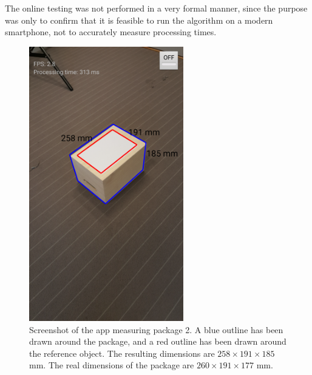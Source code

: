 The online testing was not performed in a very formal manner, since the purpose was only to confirm that it is feasible to run the algorithm on a modern smartphone, not to accurately measure processing times.

\begin{figure}
\begin{center}
\includegraphics[width=0.6\textwidth]{figures/screenshot.png}
\end{center}
\caption[A screenshot of the demo application]{Screenshot of the app measuring package 2. A blue outline has been drawn around the package, and a red outline has been drawn around the reference object. The resulting dimensions are $258 \times 191 \times 185$ mm. The real dimensions of the package are $260 \times 191 \times 177$ mm.}
\label{fig:screenshot}
\end{figure}
